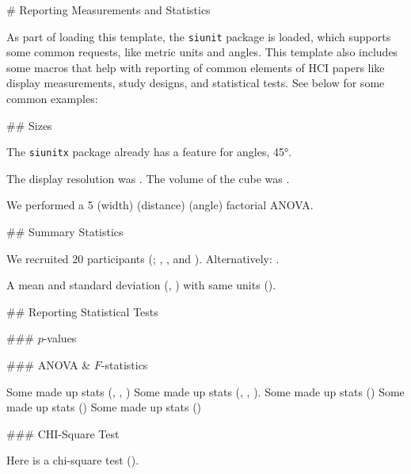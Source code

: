 \newpage
\begin{markdown}


# Reporting Measurements and Statistics
\label{sec:statistics}

As part of loading this template, the \texttt{siunit} package is loaded, which supports some common requests, like metric units and angles. This template also includes some macros that help with reporting of common elements of HCI papers like display measurements, study designs, and statistical tests. See below for some common examples: 

## Sizes

The \texttt{siunitx} package already has a feature for angles, \ang{45}.

The display resolution was .
The volume of the cube was .

We performed a 5 (width) (distance) (angle) factorial ANOVA.


## Summary Statistics

We recruited 20 participants (; , , and ).
Alternatively: .

A mean and standard deviation (, ) with same units ().



## Reporting Statistical Tests

### $p$-values


### ANOVA \& $F$-statistics

Some made up stats (, , )
Some made up stats (, , ).
Some made up stats ()
Some made up stats ()
Some made up stats ()

### CHI-Square Test

Here is a chi-square test ().


\end{markdown}